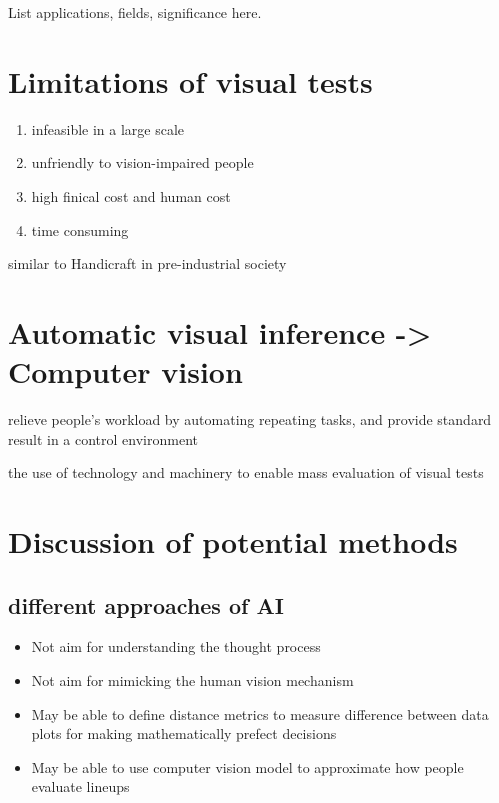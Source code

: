 \documentclass{monashthesis}
\theoremstyle{definition}
\theoremstyle{definition}
\theoremstyle{definition}
\theoremstyle{definition}
\theoremstyle{remark}
\begin{document}
List applications, fields, significance here.

\hypertarget{limitations-of-visual-tests}{%
\section{Limitations of visual tests}\label{limitations-of-visual-tests}}

\begin{enumerate}
\def\labelenumi{\arabic{enumi}.}
\tightlist
\item
  infeasible in a large scale
\item
  unfriendly to vision-impaired people
\item
  high finical cost and human cost
\item
  time consuming
\end{enumerate}

similar to Handicraft in pre-industrial society

\hypertarget{automatic-visual-inference---computer-vision}{%
\section{Automatic visual inference -\textgreater{} Computer vision}\label{automatic-visual-inference---computer-vision}}

relieve people's workload by automating repeating tasks, and provide standard result in a control environment

the use of technology and machinery to enable mass evaluation of visual tests

\hypertarget{discussion-of-potential-methods}{%
\section{Discussion of potential methods}\label{discussion-of-potential-methods}}

\hypertarget{different-approaches-of-ai}{%
\subsection{different approaches of AI}\label{different-approaches-of-ai}}

\begin{itemize}
\tightlist
\item
  Not aim for understanding the thought process
\item
  Not aim for mimicking the human vision mechanism
\item
  May be able to define distance metrics to measure difference between data plots for making mathematically prefect decisions
\item
  May be able to use computer vision model to approximate how people evaluate lineups
\end{itemize}
\end{document}
